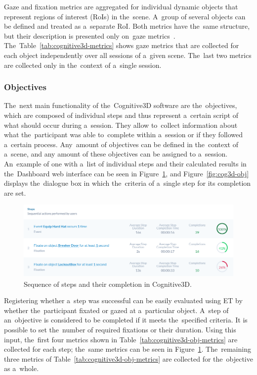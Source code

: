 Gaze and fixation metrics are aggregated for individual dynamic objects that represent regions of interest (RoIs) in the~scene. A~group of several objects can be defined and treated as a~separate RoI. Both metrics have the~same structure, but their description is presented only on~gaze metrics~\cite{cognitive3d-dynamic-objects}. The~Table~\ref{tab:cognitive3d-metrics} shows gaze metrics that are collected for each object independently over all sessions of a~given scene. The~last two metrics are collected only in the~context of a~single session.~\cite{cognitive3d-metrics}

\subsubsection*{Objectives}

The~next main functionality of the~Cognitive3D software are the~objectives, which are composed of individual steps and thus represent a~certain script of what should occur during a~session. They allow to~collect information about what the~participant was able to~complete within a~session or if they followed a~certain process. Any~amount of objectives can be defined in the~context of a~scene, and any amount of these objectives can be assigned to a~session. An~example of one with a~list of individual steps and their calculated results in the~Dashboard web interface can be seen in Figure~\ref{fig:cog3d-steps}, and Figure~\ref{fig:cog3d-obj} displays the~dialogue box in which the~criteria of a~single step for its completion are set.~\cite{cognitive3d-objectives}

\begin{figure}[!ht]\centering
    \includegraphics[width=\textwidth]{img/cognitive3D-steps.png}
    \caption[Sequence of steps and their completion in Cognitive3D.]{Sequence of steps and their completion in Cognitive3D.~\cite{cognitive3d-objectives}}
    \label{fig:cog3d-steps}
\end{figure}

\pagebreak{}
Registering whether a~step was successful can be easily evaluated using ET by whether the~participant fixated or gazed at a~particular object. A~step of an~objective is considered to be completed if it meets the~specified criteria. It is possible to set the~number of required fixations or their duration. Using this input, the~first four metrics shown in Table~\ref{tab:cognitive3d-obj-metrics} are collected for each step; the~same metrics can be seen in Figure~\ref{fig:cog3d-steps}. The~remaining three metrics of Table~\ref{tab:cognitive3d-obj-metrics} are collected for the~objective as a~whole. 

